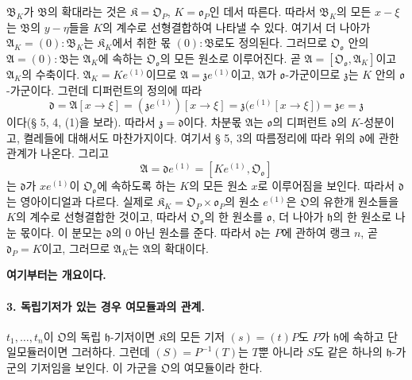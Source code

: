 \(\mathfrak B_K\)가 \(\mathfrak B\)의 확대라는 것은 \(\mathfrak K=\mathfrak O_P\), \(K=\mathfrak o_P\)인 데서 따른다. 따라서 \(\mathfrak B_K\)의 모든 \(x-\xi\)는 \(\mathfrak B\)의 \(y-\eta\)들을 \(K\)의 계수로 선형결합하여 나타낼 수 있다. 여기서 더 나아가 \(\mathfrak A_K=(0):\mathfrak B_K\)는 \(\mathfrak K_K\)에서 취한 몫 \((0):\mathfrak B\)로도 정의된다. 그러므로 \(\mathfrak O_{\mathfrak o}\) 안의 \(\mathfrak A=(0):\mathfrak B\)는 \(\mathfrak A_K\)에 속하는 \(\mathfrak O_{\mathfrak o}\)의 모든 원소로 이루어진다. 곧 \(\mathfrak A=[\mathfrak O_{\mathfrak o},\mathfrak A_K]\)이고 \(\mathfrak A_K\)의 수축이다. \(\mathfrak A_K=Ke^{(1)}\)이므로 \(\mathfrak A=\mathfrak z e^{(1)}\)이고, \(\mathfrak A\)가 \(\mathfrak o\)-가군이므로 \(\mathfrak z\)는 \(K\) 안의 \(\mathfrak o\)-가군이다. 그런데 디퍼런트의 정의에 따라
\[
\mathfrak d=\mathfrak A[x\to\xi]
=(\mathfrak z e^{(1)})[x\to\xi]
=\mathfrak z\bigl(e^{(1)}[x\to\xi]\bigr)=\mathfrak z e=\mathfrak z
\]
이다(§ 5, 4, (1)을 보라). 따라서 \(\mathfrak z=\mathfrak d\)이다. 차분몫 \(\mathfrak A\)는 \(\mathfrak o\)의 디퍼런트 \(\mathfrak d\)의 \(K\)-성분이고, 켤레들에 대해서도 마찬가지이다. 여기서 § 5, 3의 따름정리에 따라 위의 \(\mathfrak d\)에 관한 관계가 나온다. 그리고
\[
\mathfrak A=\mathfrak d e^{(1)}=[Ke^{(1)},\mathfrak O_{\mathfrak o}]
\]
는 \(\mathfrak d\)가 \(xe^{(1)}\)이 \(\mathfrak O_{\mathfrak o}\)에 속하도록 하는 \(K\)의 모든 원소 \(x\)로 이루어짐을 보인다. 따라서 \(\mathfrak d\)는 영아이디얼과 다르다. 실제로 \(\mathfrak K_K=\mathfrak O_P\times\mathfrak o_P\)의 원소 \(e^{(1)}\)은 \(\mathfrak O\)의 유한개 원소들을 \(K\)의 계수로 선형결합한 것이고, 따라서 \(\mathfrak O_{\mathfrak o}\)의 한 원소를 \(\mathfrak o\), 더 나아가 \(\mathfrak h\)의 한 원소로 나눈 몫이다. 이 분모는 \(\mathfrak d\)의 0 아닌 원소를 준다. 따라서 \(\mathfrak d\)는 \(P\)에 관하여 랭크 \(n\), 곧 \(\mathfrak d_P=K\)이고, 그러므로 \(\mathfrak A_K\)는 \(\mathfrak A\)의 확대이다.

\begin{center}
\textbf{여기부터는 개요이다.}
\end{center}

\paragraph{3. 독립기저가 있는 경우 여모듈과의 관계.}
\(t_1,\ldots,t_n\)이 \(\mathfrak O\)의 독립 \(\mathfrak h\)-기저이면 \(\mathfrak K\)의 모든 기저 \((s)=(t)P\)도 \(P\)가 \(\mathfrak h\)에 속하고 단일모듈러이면 그러하다. 그런데 \((S)=P^{-1}(T)\)는 \(T\)뿐 아니라 \(S\)도 같은 하나의 \(\mathfrak h\)-가군의 기저임을 보인다. 이 가군을 \(\mathfrak O\)의 여모듈이라 한다.

